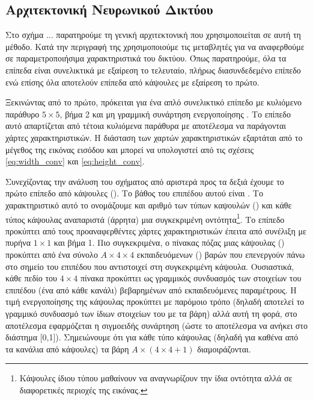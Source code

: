 \subsection{Αρχιτεκτονική Νευρωνικού Δικτύου}

Στο σχήμα ... παρατηρούμε τη γενική αρχιτεκτονική που χρησιμοποιείται σε αυτή τη μέθοδο. Κατά την περιγραφή της χρησιμοποιούμε τις μεταβλητές  για να αναφερθούμε σε παραμετροποιήσιμα χαρακτηριστικά του δικτύου. Όπως παρατηρούμε, όλα τα επίπεδα είναι συνελικτικά με εξαίρεση το τελευταίο, πλήρως διασυνδεδεμένο επίπεδο ενώ επίσης όλα αποτελούν επίπεδα από κάψουλες με εξαίρεση το πρώτο.\par

Ξεκινώντας από το πρώτο, πρόκειται για ένα απλό συνελικτικό επίπεδο με κυλιόμενο παράθυρο $5 \times 5$, βήμα 2 και μη γραμμική συνάρτηση ενεργοποίησης . Το επίπεδο αυτό απαρτίζεται από  τέτοια κυλιόμενα παράθυρα με αποτέλεσμα να παράγονται  χάρτες χαρακτηριστικών. Η διάσταση των χαρτών χαρακτηριστικών εξαρτάται από το μέγεθος της εικόνας εισόδου και μπορεί να υπολογιστεί από τις σχέσεις \ref{eq:width_conv} και  \ref{eq:height_conv}.\par

Συνεχίζοντας την ανάλυση του σχήματος από αριστερά προς τα δεξιά έχουμε το πρώτο επίπεδο από κάψουλες (). Το βάθος του επιπέδου αυτού είναι . Το χαρακτηριστικό αυτό το ονομάζουμε και αριθμό των τύπων καψουλών () και κάθε τύπος κάψουλας αναπαριστά (άρρητα) μια συγκεκριμένη οντότητα\footnote{Κάψουλες ίδιου τύπου μαθαίνουν να αναγνωρίζουν την ίδια οντότητα αλλά σε διαφορετικές περιοχές της εικόνας.}. Το επίπεδο  προκύπτει από τους προαναφερθέντες χάρτες χαρακτηριστικών έπειτα από συνέλιξη με πυρήνα $1 \times 1$ και βήμα 1. Πιο συγκεκριμένα, ο πίνακας πόζας μιας κάψουλας () προκύπτει από ένα σύνολο $ A \times 4 \times 4$ εκπαιδευόμενων () βαρών που επενεργούν πάνω στο σημείο του επιπέδου  που αντιστοιχεί στη συγκεκριμένη κάψουλα. Ουσιαστικά, κάθε πεδίο του $4 \times 4$ πίνακα προκύπτει ως γραμμικός συνδυασμός των  στοιχείων του επιπέδου  (ένα από κάθε κανάλι) βεβαρημένων από  εκπαιδευόμενες παραμέτρους. Η τιμή ενεργοποίησης της κάψουλας προκύπτει με παρόμοιο τρόπο (δηλαδή αποτελεί το γραμμικό συνδυασμό των ίδιων  στοιχείων του  με τα  βάρη) αλλά αυτή τη φορά, στο αποτέλεσμα εφαρμόζεται η σιγμοειδής συνάρτηση (ώστε το αποτέλεσμα να ανήκει στο διάστημα [0,1]). Σημειώνουμε ότι για κάθε τύπο κάψουλας (δηλαδή για καθένα από τα  κανάλια από κάψουλες) τα βάρη $ A \times (4 \times 4 + 1) $ διαμοιράζονται.\par

